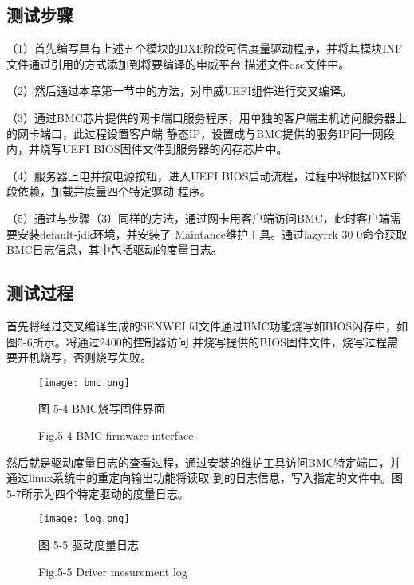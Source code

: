 \subsection{测试步骤}
（1）首先编写具有上述五个模块的DXE阶段可信度量驱动程序，并将其模块INF文件通过引用的方式添加到将要编译的申威平台
描述文件dsc文件中。
\par （2）然后通过本章第一节中的方法，对申威UEFI组件进行交叉编译。
\par （3）通过BMC芯片提供的网卡端口服务程序，用单独的客户端主机访问服务器上的网卡端口，此过程设置客户端
静态IP，设置成与BMC提供的服务IP同一网段内，并烧写UEFI BIOS固件文件到服务器的闪存芯片中。
\par （4）服务器上电并按电源按钮，进入UEFI BIOS启动流程，过程中将根据DXE阶段依赖，加载并度量四个特定驱动
程序。
\par （5）通过与步骤（3）同样的方法，通过网卡用客户端访问BMC，此时客户端需要安装default-jdk环境，并安装了
Maintance维护工具。通过lazyrrk 30 0命令获取BMC日志信息，其中包括驱动的度量日志。

\subsection{测试过程}
首先将经过交叉编译生成的SENWEI.fd文件通过BMC功能烧写如BIOS闪存中，如图5-6所示。将通过2400的控制器访问
并烧写提供的BIOS固件文件，烧写过程需要开机烧写，否则烧写失败\cite{chinese22}。

\begin{figure}[H]
    \vspace{0cm}   
    \setlength{\abovecaptionskip}{0.3cm}
	\centering
    \texttt{[image: bmc.png]}
    \caption*{图 5-4 BMC烧写固件界面}
    \setlength{\belowcaptionskip}{-0.7cm}
    \caption*{Fig.5-4 BMC firmware interface}
\end{figure}

然后就是驱动度量日志的查看过程，通过安装的维护工具访问BMC特定端口，并通过linux系统中的重定向输出功能将读取
到的日志信息，写入指定的文件中。图5-7所示为四个特定驱动的度量日志。

\begin{figure}[H]
    \vspace{0cm}   
    \setlength{\abovecaptionskip}{0.3cm}
	\centering
    \texttt{[image: log.png]}
    \caption*{图 5-5 驱动度量日志}
    \setlength{\belowcaptionskip}{-0.7cm}
    \caption*{Fig.5-5 Driver mesurement log}
\end{figure}

